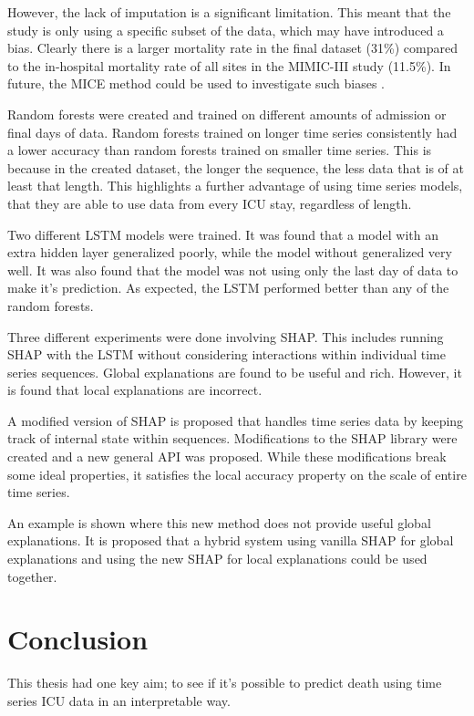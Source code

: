 \documentclass[12pt]{article}
\begin{document}
However, the lack of imputation is a significant limitation. This meant that the study is only using a specific subset of the data, which may have introduced a bias. Clearly there is a larger mortality rate in the final dataset (31\%) compared to the in-hospital mortality rate of all sites in the MIMIC-III study (11.5\%). In future, the MICE method could be used to investigate such biases \cite{MICE}. 

Random forests were created and trained on different amounts of admission or final days of data. Random forests trained on longer time series consistently had a lower accuracy than random forests trained on smaller time series. This is because in the created dataset, the longer the sequence, the less data that is of at least that length. This highlights a further advantage of using time series models, that they are able to use data from every ICU stay, regardless of length.

Two different LSTM models were trained. It was found that a model with an extra hidden layer generalized poorly, while the model without generalized very well. It was also found that the model was not using only the last day of data to make it's prediction. As expected, the LSTM performed better than any of the random forests. 

Three different experiments were done involving SHAP. This includes running SHAP with the LSTM without considering interactions within individual time series sequences. Global explanations are found to be useful and rich. However, it is found that local explanations are incorrect.

A modified version of SHAP is proposed that handles time series data by keeping track of internal state within sequences. Modifications to the SHAP library were created and a new general API was proposed. While these modifications break some ideal properties, it satisfies the local accuracy property on the scale of entire time series. 

An example is shown where this new method does not provide useful global explanations. It is proposed that a hybrid system using vanilla SHAP for global explanations and using the new SHAP for local explanations could be used together.

\section{Conclusion}

This thesis had one key aim; to see if it's possible to predict death using time series ICU data in an interpretable way.
\end{document}
